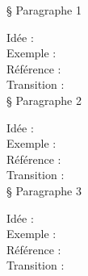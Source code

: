 § Paragraphe 1

Idée :\\
Exemple :\\
Référence :\\
Transition :\\

§ Paragraphe 2

Idée :\\
Exemple :\\
Référence :\\
Transition :\\

§ Paragraphe 3

Idée :\\
Exemple :\\
Référence :\\
Transition :\\
